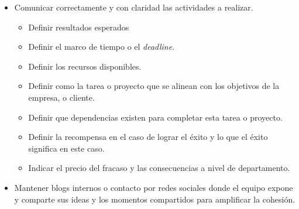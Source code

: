 \begin{itemize}
\item Comunicar correctamente y con claridad las actividades a realizar.
    \begin{itemize}
    \item Definir resultados esperados
    \item Definir el marco de tiempo o el \textit{deadline}.
    \item Definir los recursos disponibles.
    \item Definir como la tarea o proyecto que se alinean con los objetivos de la empresa, o cliente.
    \item Definir que dependencias existen para completar esta tarea o proyecto.
    \item Definir la recompensa en el caso de  lograr el éxito y lo que el éxito significa en este caso.
    \item Indicar el precio del fracaso y las consecuencias a nivel de departamento.
    \end{itemize}
\item Mantener blogs internos o contacto por redes sociales donde el equipo expone y comparte sus ideas y los momentos compartidos para amplificar la cohesión.
\end{itemize}

         
